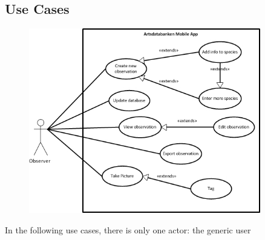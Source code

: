 \subsection{Use Cases}
\label{sec:usecases}

\begin{figure}[htb]
	\centering
	\includegraphics[width=0.9\textwidth]{reqspec/mainusecase.jpg}
	\label{fig:usecase}
\end{figure}

In the following use cases, there is only one actor: the generic user
\hspace{2em}

